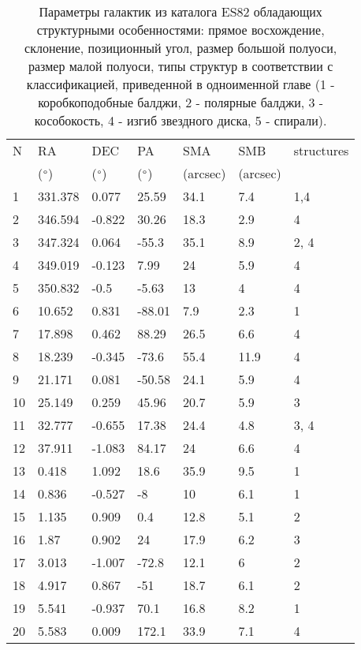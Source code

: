 \begin{longtable}{|l|l|l|l|l|l|l|}
\caption{Параметры галактик из каталога ES82 обладающих структурными особенностями: прямое восхождение, склонение, позиционный угол, размер большой полуоси, размер малой полуоси, типы структур в соответствии с классификацией, приведенной в одноименной главе (1 - коробкоподобные балджи, 2 - полярные балджи, 3 - кособокость, 4 - изгиб звездного диска, 5 - спирали).} \label{tab:tab2} \\\hline
    
 N & RA & DEC & PA  & SMA  & SMB  & structures \\ 
 &($\degree$) & ($\degree$) & ($\degree$) & (arcsec) & (arcsec) & \\
 \hline \hline 
        1 & 331.378 & 0.077 & 25.59 & 34.1 & 7.4 & 1,4 \\ 
        2 & 346.594 & -0.822 & 30.26 & 18.3 & 2.9 & 4 \\ 
        3 & 347.324 & 0.064 & -55.3 & 35.1 & 8.9 & 2, 4 \\ 
        4 & 349.019 & -0.123 & 7.99 & 24 & 5.9 & 4 \\ 
        5 & 350.832 & -0.5 & -5.63 & 13 & 4 & 4 \\ 
        6 & 10.652 & 0.831 & -88.01 & 7.9 & 2.3 & 1 \\ 
        7 & 17.898 & 0.462 & 88.29 & 26.5 & 6.6 & 4 \\ 
        8 & 18.239 & -0.345 & -73.6 & 55.4 & 11.9 & 4 \\ 
        9 & 21.171 & 0.081 & -50.58 & 24.1 & 5.9 & 4 \\ 
        10 & 25.149 & 0.259 & 45.96 & 20.7 & 5.9 & 3 \\ 
        11 & 32.777 & -0.655 & 17.38 & 24.4 & 4.8 & 3, 4 \\ 
        12 & 37.911 & -1.083 & 84.17 & 24 & 6.6 & 4 \\ 
        13 & 0.418 & 1.092 & 18.6 & 35.9 & 9.5 & 1 \\ 
        14 & 0.836 & -0.527 & -8 & 10 & 6.1 & 1 \\ 
        15 & 1.135 & 0.909 & 0.4 & 12.8 & 5.1 & 2 \\ 
        16 & 1.87 & 0.902 & 24 & 17.9 & 6.2 & 3 \\ 
        17 & 3.013 & -1.007 & -72.8 & 12.1 & 6 & 2 \\ 
        18 & 4.917 & 0.867 & -51 & 18.7 & 6.1 & 2 \\ 
        19 & 5.541 & -0.937 & 70.1 & 16.8 & 8.2 & 1 \\ 
        20 & 5.583 & 0.009 & 172.1 & 33.9 & 7.1 & 4 \\ 

\end{longtable}
